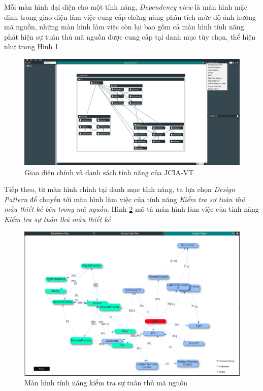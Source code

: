 \documentclass[12pt]{report}
\begin{document}
\noindent Mỗi màn hình đại diện cho một tính năng, \textit{Dependency view} là màn hình mặc định trong giao diện làm việc cung cấp chứng năng phân tích mức độ ảnh hưởng mã nguồn, những màn hình làm việc còn lại bao gồm cả màn hình tính năng phát hiện sự tuân thủ mã nguồn được cung cấp tại danh mục tùy chọn, thể hiện như trong Hình \ref{fig:main_screen}
\begin{figure}[h]
	\centering
	\includegraphics[scale=0.25]{images/main_screen}
	\caption{Giao diện chính và danh sách tính năng của JCIA-VT}
	\label{fig:main_screen}
\end{figure}

\noindent Tiếp theo, từ màn hình chính tại danh mục tính năng, ta lựa chọn \textit{Design Pattern} để chuyển tới màn hình làm việc của tính năng \textit{Kiểm tra sự tuân thủ mẫu thiết kế bên trong mã nguồn}. Hình \ref{fig:design_pattern_workspace} mô tả màn hình làm việc của tính năng \textit{Kiểm tra sự tuân thủ mẫu thiết kế}
\begin{figure}[h]
	\centering
	\includegraphics[scale=0.35]{images/design_pattern_workspace}
	\caption{Màn hình tính năng kiểm tra sự tuân thủ mã nguồn}
	\label{fig:design_pattern_workspace}
\end{figure}
\end{document}
